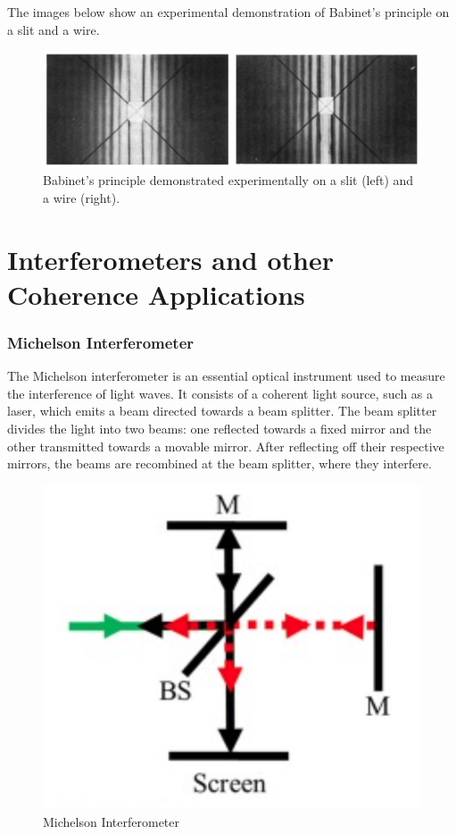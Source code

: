 \documentclass[
  a4paper,
]{book}
\begin{document}
The images below show an experimental demonstration of Babinet's
principle on a slit and a wire.

\begin{figure}[H]

{\centering \includegraphics[width=0.9\linewidth,height=\textheight,keepaspectratio]{wave-optics/img/babinet_exp.png}

}

\caption{Babinet's principle demonstrated experimentally on a slit
(left) and a wire (right).}

\end{figure}%

\chapter{Interferometers and other Coherence
Applications}\label{interferometers-and-other-coherence-applications}

\subsection{Michelson Interferometer}\label{michelson-interferometer}

The Michelson interferometer is an essential optical instrument used to
measure the interference of light waves. It consists of a coherent light
source, such as a laser, which emits a beam directed towards a beam
splitter. The beam splitter divides the light into two beams: one
reflected towards a fixed mirror and the other transmitted towards a
movable mirror. After reflecting off their respective mirrors, the beams
are recombined at the beam splitter, where they interfere.

\begin{figure}[H]

{\centering \includegraphics[width=0.3\linewidth,height=\textheight,keepaspectratio]{wave-optics/img/michelson.png}

}

\caption{Michelson Interferometer}

\end{figure}%
\end{document}
